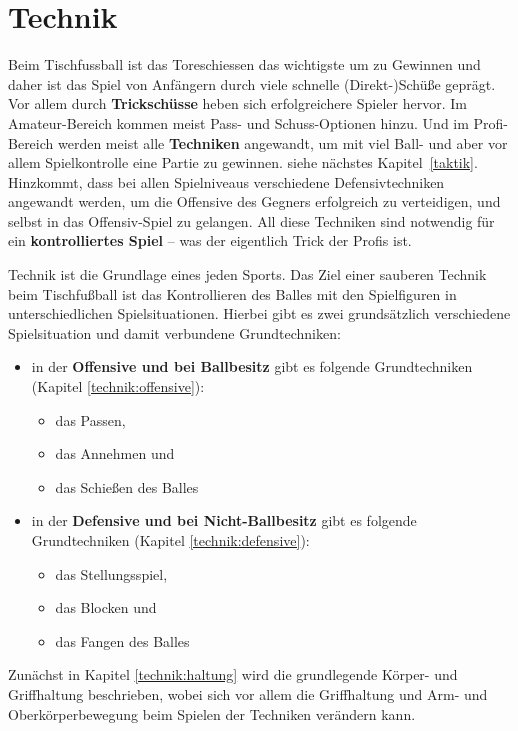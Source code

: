 \chapter{Technik}
\label{technik}

Beim Tischfussball ist das Toreschiessen das wichtigste um zu Gewinnen und daher ist das Spiel von Anfängern durch viele schnelle (Direkt-)Schüße geprägt.
Vor allem durch \textbf{Trickschüsse} heben sich erfolgreichere Spieler hervor.
Im Amateur-Bereich kommen meist Pass- und Schuss-Optionen hinzu.
Und im Profi-Bereich werden meist alle \textbf{Techniken} angewandt, um mit viel Ball- und aber vor allem Spielkontrolle eine Partie zu gewinnen. siehe nächstes Kapitel~\ref{taktik}. 
Hinzkommt, dass bei allen Spielniveaus verschiedene Defensivtechniken angewandt werden, um die Offensive des Gegners erfolgreich zu verteidigen, und selbst in das Offensiv-Spiel zu gelangen.
All diese Techniken sind notwendig für ein \textbf{kontrolliertes Spiel} -- was der eigentlich Trick der Profis ist.

Technik ist die Grundlage eines jeden Sports. 
Das Ziel einer sauberen Technik beim Tischfußball ist das Kontrollieren des Balles mit den Spielfiguren in unterschiedlichen Spielsituationen.
Hierbei gibt es zwei grundsätzlich verschiedene Spielsituation und damit verbundene Grundtechniken:
\begin{itemize}
    \item in der \textbf{Offensive und bei Ballbesitz} gibt es folgende Grundtechniken (Kapitel \ref{technik:offensive}):
        \begin{itemize}
            \item das Passen, 
            \item das Annehmen und 
            \item das Schießen des Balles
        \end{itemize}
    \item in der \textbf{Defensive  und bei Nicht-Ballbesitz} gibt es folgende Grundtechniken (Kapitel \ref{technik:defensive}):
        \begin{itemize}
            \item das Stellungsspiel, 
            \item das Blocken und 
            \item das Fangen des Balles  
        \end{itemize}
\end{itemize}
Zunächst in Kapitel \ref{technik:haltung} wird die grundlegende Körper- und Griffhaltung beschrieben, wobei sich vor allem die Griffhaltung und Arm- und Oberkörperbewegung beim Spielen der Techniken verändern kann. 

